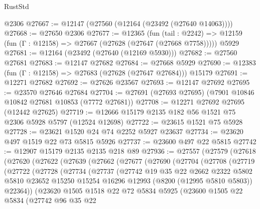 \begin{lexlean}{RustStd}
\begin{coremodule}
    @2306
@27667 := @12147 (@27560 (@12164 (@23492 (@27640 @14063))))
@27668 := @27650 @2306
@27677 := @12365
    (fun (tail : @2242) => @12159 (fun (Γ : @12158) => @27667 (@27628 (@27647 (@27668 @7758)))))
    @5929
@27681 := @12164 (@23492 (@27640 (@12169 @5930)))
@27682 := @27560 @27681
@27683 := @12147 @27682
@27684 := @27668 @5929
@27690 := @12383 (fun (Γ : @12158) => @27683 (@27628 (@27647 @27684))) @15179
@27691 := @12271 @27682
@27692 := @27626 @23567
@27693 := @12147 @27692
@27695 := @23570 @27646 @27684
@27704 := @27691 (@27693 @27695) (@7901 @10846 @10842 @27681 @10853 (@7772 @27681))
@27708 := @12271 @27692 @27695 (@12442 @27625)
@27719 := @12666 @15179 @2135 @182 @56 @1521 @75 @2306 @5928 @5797 (@12524 @12698)
@27722 := @23615 @1521 @75 @5928
@27728 := @23621 @1520 @24 @74 @2252 @5927 @23637
@27734 := @23620 @497 @1519 @22 @73 @5815 @5926
@27737 := @23600 @497 @22 @5815
@27742 := @12907 @15179 @2135 @2135 @218 @89
@27936 := @27557
    (@27579
      (@27618
        (@27620
          (@27622
            (@27639
              (@27662
                (@27677
                  (@27690
                    (@27704
                      (@27708
                        (@27719
                          (@27722
                            (@27728
                              (@27734
                                (@27737
                                  (@27742
                                    @19
                                    @35
                                    @22
                                    @2662
                                    @2322
                                    @5802
                                    @5810
                                    @23652
                                    @15250
                                    @15254
                                    @16296
                                    @12993
                                    (@8200 (@12995 @5810 @5803))
                                    @22364))
                                (@23620
                                  @1505
                                  @1518
                                  @22
                                  @72
                                  @5834
                                  @5925
                                  (@23600
                                    @1505
                                    @22
                                    @5834
                                    (@27742
                                      @96
                                      @35
                                      @22

\end{coremodule}
\end{lexlean}
